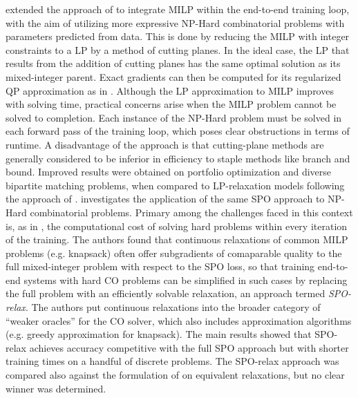  extended the approach of  to integrate MILP within the end-to-end training loop, with the aim of utilizing more expressive NP-Hard combinatorial problems with parameters predicted from data. This is done by reducing the MILP with integer constraints to a LP by a method of cutting planes. In the ideal case, the LP that results from the addition of cutting planes has the same optimal solution as its mixed-integer parent. Exact gradients can then be computed for its regularized QP approximation as in . Although the LP approximation to MILP improves with solving time, practical concerns arise when the MILP problem cannot be solved to completion. Each instance of the NP-Hard problem must be solved in each forward pass of the training loop, which poses clear obstructions in terms of runtime. 
A disadvantage of the approach is that cutting-plane methods are generally considered to be inferior in efficiency to staple methods like branch and bound.
Improved results were obtained on portfolio optimization and diverse bipartite matching problems,  when compared to  LP-relaxation models following the approach of .
 investigates the application of the same SPO approach to NP-Hard combinatorial problems. Primary among the challenges faced in this context is, as in , the computational cost of solving hard problems within every iteration of the training. The authors found that continuous relaxations of common MILP problems (e.g. knapsack) often offer subgradients of comaparable quality to the full mixed-integer problem with respect to the SPO loss, so that training end-to-end systems with hard CO problems can be simplified in such cases by replacing the full problem with an efficiently solvable relaxation, an approach termed \emph{SPO-relax}. The authors put continuous relaxations into the broader category of ``weaker oracles'' for the CO solver, which also includes approximation algorithms (e.g. greedy approximation for knapsack). 
The main results showed that SPO-relax achieves accuracy competitive with the full SPO approach but with shorter training times on a handful of discrete problems. The SPO-relax approach was compared also against the formulation of  on equivalent relaxations, but no clear winner was determined. 
